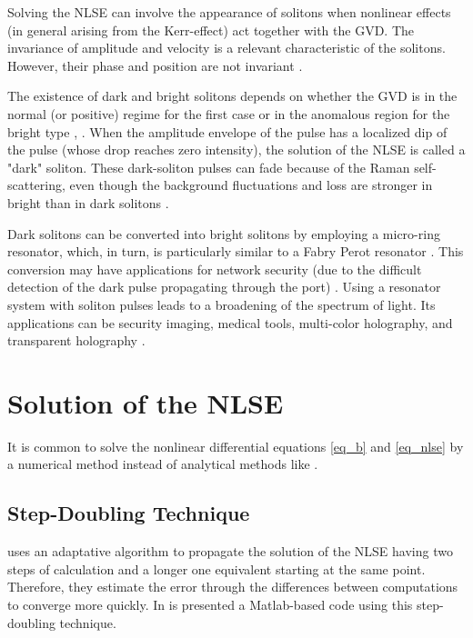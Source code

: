     
    Solving the \gls{NLSE} can involve the appearance of solitons when nonlinear effects (in general arising from the Kerr-effect) act together with the \gls{GVD}. The invariance of amplitude and velocity is a relevant characteristic of the solitons. However, their phase and position are not invariant \cite{Kodama1994}. 
    
    The existence of dark and bright solitons depends on whether the \gls{GVD} is in the normal (or positive) regime for the first case or in the anomalous region for the bright type \cite{KIVSHAR199881}, \cite{agr_pap}.  When the amplitude envelope of the pulse has a localized dip of the pulse (whose drop reaches zero intensity), the solution of the \gls{NLSE} is called a "dark" soliton. These dark-soliton pulses can fade because of the Raman self-scattering, even though the background fluctuations and loss are stronger in bright than in dark solitons \cite{kivshar}. 
    
    Dark solitons can be converted into bright solitons by employing a micro-ring resonator, which, in turn, is particularly similar to a Fabry Perot resonator \cite{yupapin}. This conversion may have applications for network security (due to the difficult detection of the dark pulse propagating through the port) \cite{darkks}. Using a resonator system with soliton pulses leads to a broadening of the spectrum of light. Its applications can be security imaging, medical tools, multi-color holography, and transparent holography \cite{yupapin}.

\section{Solution of the NLSE}

    It is common to solve the nonlinear differential equations \eqref{eq_b} and \eqref{eq_nlse} by a numerical method instead of analytical methods like \citep{Mihalache_1993}.  


    \subsection{Step-Doubling Technique}
         \citep{dudley_taylor_2010} uses an adaptative algorithm to propagate the solution of the NLSE having two steps of calculation and a longer one equivalent starting at the same point. Therefore, they estimate the error through the differences between computations to converge more quickly. In \citep{gitdud}  is presented a Matlab-based code using this step-doubling technique. 
         
